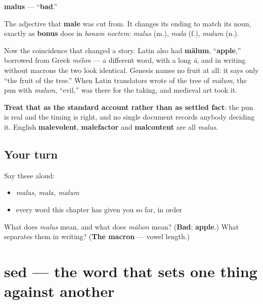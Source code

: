 \begin{cousinweb}
\textbf{malus} — \textquotedblleft{}\textbf{bad}.\textquotedblright{}

The adjective that \textbf{male} was cut from. It changes its ending to match its noun, exactly as \textbf{bonus} does in \emph{bonam noctem}: \emph{malus} (m.), \emph{mala} (f.), \emph{malum} (n.).

Now the coincidence that changed a story. Latin also had \textbf{mālum}, \textquotedblleft{}\textbf{apple},\textquotedblright{} borrowed from Greek \emph{mēlon} — a different word, with a long \emph{ā}, and in writing without macrons the two look identical. Genesis names no fruit at all: it says only \textquotedblleft{}the fruit of the tree.\textquotedblright{} When Latin translators wrote of the tree of \emph{mālum}, the pun with \emph{malum}, \textquotedblleft{}evil,\textquotedblright{} was there for the taking, and medieval art took it.

\textbf{Treat that as the standard account rather than as settled fact}: the pun is real and the timing is right, and no single document records anybody deciding it. English \textbf{malevolent}, \textbf{malefactor} and \textbf{malcontent} are all \emph{malus}.
\end{cousinweb}

\subsection*{Your turn}
Say these aloud:

\begin{itemize}
\raggedright
  \item \emph{malus, mala, malum}
  \item every word this chapter has given you so far, in order
\end{itemize}

\begin{tcolorbox}[breakable,colback=teal!4,colframe=teal!35!black,title={Before you move on}]
What does \emph{malus} mean, and what does \emph{mālum} mean? (\textbf{Bad}; \textbf{apple}.) What separates them in writing? (\textbf{The macron} — vowel length.)
\end{tcolorbox}
\section[sed]{sed — the word that sets one thing against another}

\label{lesson:LA-C48-sed}



